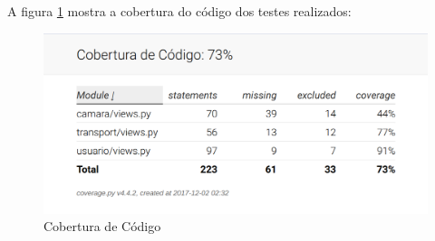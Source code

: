 A figura \ref{cobertura_codigo} mostra a cobertura do código dos testes realizados:

\begin{figure}[H]
	\centering
	\includegraphics[width=14cm]{figuras/cobertura_codigo.png}
	\caption{Cobertura de Código} \label{cobertura_codigo}
\end{figure}




